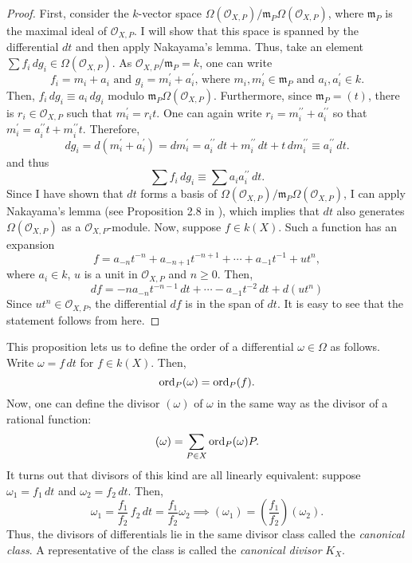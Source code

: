 \begin{proof}
  First, consider the $k$-vector space
  $\Omega\left(\mathscr{O}_{X,P}\right)/\mathfrak{m}_{P}\Omega\left(
    \mathscr{O}_{X,P}\right)$, where
  $\mathfrak{m}_{P}$ is the maximal ideal of $\mathscr{O}_{X,P}$. I will show
  that this space is spanned by the differential $dt$ and then apply
  Nakayama's lemma. Thus, take an element $\sum f_{i}\,dg_{i}\in\Omega\left(
    \mathscr{O}_{X,P}\right)$. As $\mathscr{O}_{X,P}/\mathfrak{m}_{P}=k$,
  one can write
  \[
    f_{i}=m_{i}+a_{i}\text{ and }g_{i}=m_{i}^{\prime}+a_{i}^{\prime}
    \text{, where } m_{i}, m_{i}^{\prime}\in\mathfrak{m}_{P}
    \text{ and } a_{i}, a_{i}^{\prime}\in k.
  \]
  Then, $f_{i}\,dg_{i}\equiv a_{i}\,dg_{i}$ modulo
  $\mathfrak{m}_{P}\Omega\left(\mathscr{O}_{X,P}\right)$.
  Furthermore, since $\mathfrak{m}_{P}=(t)$, there is
  $r_{i}\in\mathscr{O}_{X,P}$ such that $m_{i}^{\prime}=r_{i}t$. One can again
  write $r_{i}=m_{i}^{\prime\prime}+a_{i}^{\prime\prime}$ so that
  $m_{i}^{\prime}=a_{i}^{\prime\prime}t+m_{i}^{\prime\prime}t$. Therefore,
  \[
    dg_{i}=d\left(m_{i}^{\prime}+a_{i}^{\prime}\right)=dm_{i}^{\prime}
    =a_{i}^{\prime\prime}\,dt+m_{i}^{\prime\prime}\,dt+t\,dm_{i}^{\prime\prime}
    \equiv a_{i}^{\prime\prime}\,dt.
  \]
  and thus
  \[
    \sum f_{i}\,dg_{i}\equiv \sum a_{i}a_{i}^{\prime\prime}\,dt.
  \]
  Since I have shown that $dt$ forms a basis of
  $\Omega\left(\mathscr{O}_{X,P}\right)/\mathfrak{m}_{P}\Omega\left(
    \mathscr{O}_{X,P}\right)$, I can apply Nakayama's lemma
  (see Proposition 2.8 in \cite{am}), which implies that $dt$ also generates
  $\Omega\left(\mathscr{O}_{X,P}\right)$ as a $\mathscr{O}_{X,P}$-module.
  Now, suppose $f\in k(X)$. Such a function has an expansion
  \[
    f=a_{-n}t^{-n}+a_{-n+1}t^{-n+1}+\cdots +a_{-1}t^{-1}+ut^{n},
  \]
  where $a_{i}\in k$, $u$ is a unit in $\mathscr{O}_{X,P}$ and $n\geq 0$.
  Then,
  \[
    df=-na_{-n}t^{-n-1}\,dt+\cdots-a_{-1}t^{-2}\,dt+d\left(ut^{n}\right)
  \]
  Since $ut^{n}\in\mathscr{O}_{X,P}$, the differential $df$ is in the span
  of $dt$. It is easy to see that the statement follows from here.
\end{proof}
This proposition lets us to define the order of a differential
$\omega\in\Omega$ as follows. Write $\omega=f\,dt$ for $f\in k(X)$. Then,
\[
  \operatorname{ord}_{P}(\omega)=\operatorname{ord}_{P}(f).
\]
Now, one can define the divisor $(\omega)$ of $\omega$ in the same way as
the divisor of a rational function:
\[
  (\omega)=\sum_{P\in X}\operatorname{ord}_{P}(\omega)P.
\]
It turns out that divisors of this kind are all linearly equivalent: suppose
$\omega_{1}=f_{1}\,dt$ and $\omega_{2}=f_{2}\,dt$. Then,
\[
  \omega_{1}=\frac{f_{1}}{f_{2}}\, f_{2}\,dt=\frac{f_{1}}{f_{2}}\omega_{2}
  \implies (\omega_{1})=\left(\frac{f_{1}}{f_{2}}\right)(\omega_{2}).
\]
Thus, the divisors of differentials lie in the same divisor class called the
\emph{canonical class}. A representative of the class is called the
\emph{canonical divisor} $K_{X}$.

